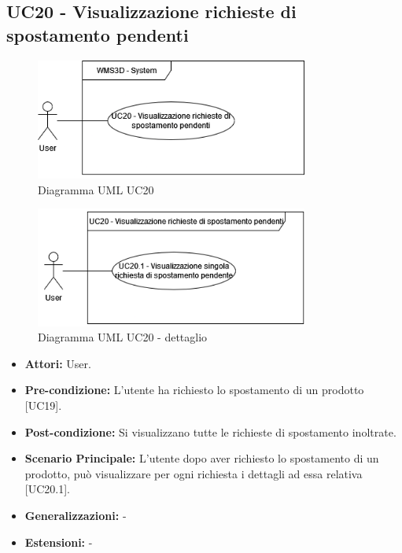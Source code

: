 \subsection{UC20 - Visualizzazione richieste di spostamento pendenti}
\begin{figure}[H]
  \centering
  \includegraphics[width=0.8\textwidth]{UC_diagrams_11-20/UC20_sys.drawio.png}
   \caption{Diagramma UML UC20}
\end{figure}
\begin{figure}[H]
  \centering
  \includegraphics[width=0.8\textwidth]{UC_diagrams_11-20/UC20.drawio.png}
   \caption{Diagramma UML UC20 - dettaglio}
\end{figure}
\begin{itemize}
    \item \textbf{Attori:} User.
    \item \textbf{Pre-condizione:}  L'utente ha richiesto lo spostamento di un prodotto [UC19].
    \item \textbf{Post-condizione:} Si visualizzano tutte le richieste di spostamento inoltrate.
    \item \textbf{Scenario Principale:} L'utente dopo aver richiesto lo spostamento di un prodotto, può visualizzare per ogni richiesta i dettagli ad essa relativa [UC20.1].
    \item \textbf{Generalizzazioni:} -
    \item \textbf{Estensioni:} -
\end{itemize}


